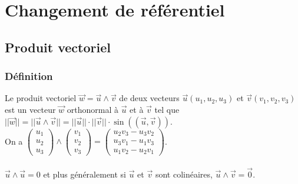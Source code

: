 \documentclass[a4paper,10pt]{book} %
\begin{document}





\chapter{Changement de référentiel}
\section*{Produit vectoriel}
\subsection*{Définition}
Le produit vectoriel $\vec{w}=\vec{u}\wedge\vec{v}$ de deux vecteurs $\vec{u}(u_1,u_2,u_3)$ et $\vec{v}(v_1,v_2,v_3)$ est un vecteur $\vec{w}$ orthonormal à $\vec{u}$ et à $\vec{v}$ tel que $||\vec{w}||=||\vec{u}\wedge\vec{v}||=||\vec{u}||\cdot ||\vec{v}||\cdot \sin((\vec{u},\vec{v}))$.\\

On a $\begin{pmatrix}
u_1 \\ u_2 \\ u_3
\end{pmatrix}\wedge \begin{pmatrix}
v_1 \\ v_2 \\ v_3
\end{pmatrix}=\begin{pmatrix}
u_2v_3-u_3v_2 \\
u_3v_1-u_1v_3 \\
u_1v_2-u_2v_1
\end{pmatrix}$.\\\\

$\vec{u}\wedge\vec{u}=0$ et plus généralement si $\vec{u}$ et $\vec{v}$ sont colinéaires, $\vec{u}\wedge\vec{v}=\vec{0}$.
\end{document}
